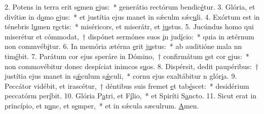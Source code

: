 2. Potens in terra erit s\uline{e}men \uline{e}jus:~* generátio rectórum bendic\uline{é}tur.
3. Glória, et divítiæ in d\uline{o}mo \uline{e}jus:~* et justítia ejus manet in sǽculm sǽc\uline{u}li.
4. Exórtum est in ténebris l\uline{u}men r\uline{e}ctis:~* miséricors, et miserátr, et j\uline{u}stus.
5. Jucúndus homo qui miserétur et cómmodat,~† dispónet sermónes suos \uline{i}n jud\uline{í}cio:~* quia in ætérnum non commvéb\uline{i}tur.
6. In memória ætérna \uline{e}rit j\uline{u}stus:~* ab auditióne mala nn tim\uline{é}bit.
7. Parátum cor ejus speráre in Dómino,~† confirmátum \uline{e}st cor \uline{e}jus:~* non commovébitur donec despíciat inimcos s\uline{u}os.
8. Dispérsit, dedit paupéribus:~† justítia ejus manet in s\uline{ǽ}culum s\uline{ǽ}culi,~* cornu ejus exaltábitur n glór\uline{i}a.
9. Peccátor vidébit, et irascétur,~† déntibus suis fremet \uline{e}t tab\uline{é}scet:~* desidérium peccatórm per\uline{í}bit.
10. Glória P\uline{a}tri, et F\uline{í}lio,~* et Spiríti S\uline{a}ncto.
11. Sicut erat in princípio, et n\uline{u}nc, et s\uline{e}mper,~* et in sǽcula sæculrum. \uline{A}men.
